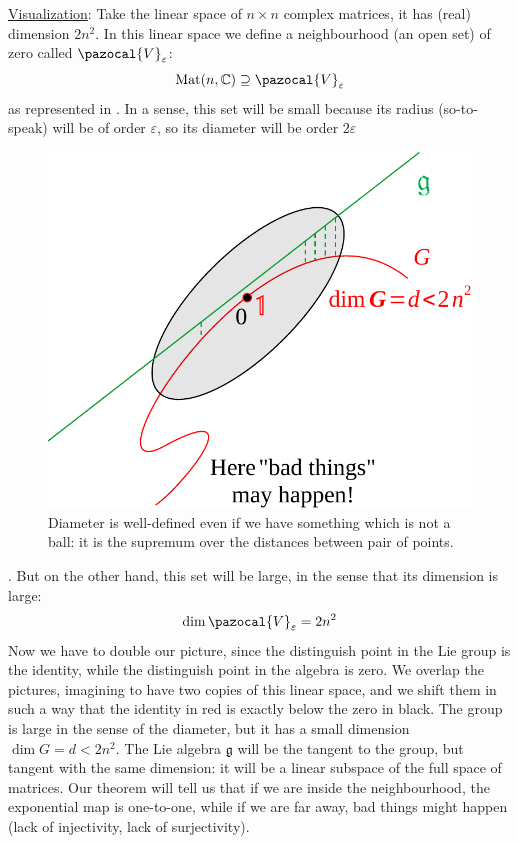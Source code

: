 \documentclass[../main.tex]{subfiles}
\begin{document}
\underline{Visualization}: Take the linear space of $n\times n$ complex matrices, it has (real) dimension $2n^2$. In this linear space we define a neighbourhood (an open set) of zero called $\pazocal{V}_\varepsilon$:
\[
\textrm{Mat}(n,\mathbb{C})\supseteq \pazocal{V}_\varepsilon
\]
as represented in . In a sense, this set will be small because its radius (so-to-speak) will be of order $\varepsilon$, so its diameter will be order $2\varepsilon$
\begin{figure}[h!]
	\includegraphics[width=1\linewidth]{images/visualization_exp_G.pdf}
	\caption[Visualization of the exponential map of $G$]{Diameter is well-defined even if we have something which is not a ball: it is the supremum over the distances between pair of points.}
\end{figure}. But on the other hand, this set will be large, in the sense that its dimension is large: 
\[
\dim \pazocal{V}_\varepsilon=2n^2
\]
Now we have to double our picture, since the distinguish point in the Lie group is the identity, while the distinguish point in the algebra is zero. We overlap the pictures, imagining to have two copies of this linear space, and we shift them in such a way that the identity in red is exactly below the zero in black. The group is large in the sense of the diameter, but it has a small dimension $\dim G=d<2n^2$. The Lie algebra $\mathfrak{g}$ will be the tangent to the group, but tangent with the same dimension: it will be a linear subspace of the full space of matrices. Our theorem will tell us that if we are inside the neighbourhood, the exponential map is one-to-one, while if we are far away, bad things might happen (lack of injectivity, lack of surjectivity).
\end{document}
